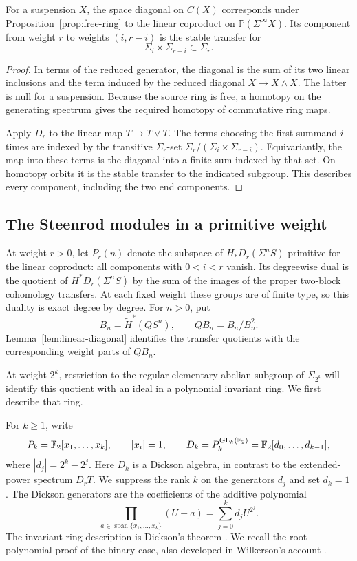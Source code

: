 \begin{lemma}\label{lem:linear-diagonal}
For a suspension $X$, the space diagonal on $C(X)$ corresponds under
Proposition~\ref{prop:free-ring} to the linear coproduct on
$\mathbb P(\Sigma^\infty X)$. Its component from weight $r$ to weights
$(i,r-i)$ is the stable transfer for
\[
 \Sigma_i\times\Sigma_{r-i}\subset\Sigma_r.
\]
\end{lemma}

\begin{proof}
In terms of the reduced generator, the diagonal is the sum of its two
linear inclusions and the term induced by the reduced diagonal
$X\to X\wedge X$. The latter is null for a suspension. Because the
source ring is free, a homotopy on the generating spectrum gives the
required homotopy of commutative ring maps.

Apply $D_r$ to the linear map $T\to T\vee T$. The terms choosing the
first summand $i$ times are indexed by the transitive $\Sigma_r$-set
$\Sigma_r/(\Sigma_i\times\Sigma_{r-i})$. Equivariantly, the map into
these terms is the diagonal into a finite sum indexed by that set.
On homotopy orbits it is the stable transfer to the indicated subgroup.
This describes every component, including the two end components.
\end{proof}

\subsection{The Steenrod modules in a primitive weight}

At weight $r>0$, let $P_r(n)$ denote the subspace of
$H_*D_r(\Sigma^nS)$ primitive for the linear coproduct: all components
with $0<i<r$ vanish. Its degreewise dual is the quotient of
$H^*D_r(\Sigma^nS)$ by the sum of the images of the proper two-block
cohomology transfers. At each fixed weight these groups are of finite
type, so this duality is exact degree by degree. For $n>0$, put
\[
 B_n=\widetilde H^*(QS^n),\qquad QB_n=B_n/B_n^2.
\]
Lemma~\ref{lem:linear-diagonal} identifies the transfer quotients with
the corresponding weight parts of $QB_n$.

At weight $2^k$, restriction to the regular elementary abelian subgroup
of $\Sigma_{2^k}$ will identify this quotient with an ideal in a
polynomial invariant ring. We first describe that ring.

For $k\geq1$, write
\[
 P_k=\mathbb F_2[x_1,\ldots,x_k],\qquad |x_i|=1,
 \qquad D_k=P_k^{\operatorname{GL}_k(\mathbb F_2)}
       =\mathbb F_2[d_0,\ldots,d_{k-1}],
\]
where $|d_j|=2^k-2^j$. Here $D_k$ is a Dickson algebra, in contrast to
the extended-power spectrum $D_rT$. We suppress the rank $k$ on the
generators $d_j$ and set $d_k=1$. The Dickson generators are the
coefficients of the additive polynomial
\begin{equation}\label{eq:dickson-polynomial}
 \prod_{a\in\operatorname{span}\{x_1,\ldots,x_k\}}(U+a)
   =\sum_{j=0}^k d_jU^{2^j}.
\end{equation}
The invariant-ring description is Dickson's theorem
\cite{Dickson1911}. We recall the root-polynomial proof of the
binary case, also developed in Wilkerson's account
\cite[\S I]{Wilkerson1983}.

